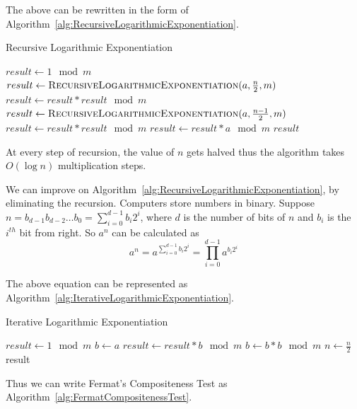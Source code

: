 \documentclass[11pt]{report}
\begin{document}
The above can be rewritten in the form of Algorithm~\ref{alg:RecursiveLogarithmicExponentiation}.

\begin{algorithm}
\caption{Recursive Logarithmic Exponentiation}
\label{alg:RecursiveLogarithmicExponentiation}
\begin{algorithmic}
\State $result \gets 1 \mod m$ 
	\State $result \gets \Call{RecursiveLogarithmicExponentiation}{a, \frac n 2, m}$
	\State $result \gets result * result \mod m$ 
	\State $result \gets \Call{RecursiveLogarithmicExponentiation}{a, \frac {n-1} 2, m}$
	\State $result \gets result * result \mod m$
	\State $result \gets result * a \mod m$
\EndIf
\State \Return $result$
\EndProcedure
\end{algorithmic}
\end{algorithm}

At every step of recursion, the value of $n$ gets halved thus the algorithm takes $O(\log n)$ multiplication steps.

We can improve on Algorithm~\ref{alg:RecursiveLogarithmicExponentiation}, by eliminating the recursion. Computers store numbers in binary. Suppose $n = b_{d-1}b_{d-2}\dots b_{0} = \sum_{i=0}^{d-1}b_i 2^i$, where $d$ is the number of bits of $n$ and $b_i$ is the $i^{th}$ bit from right. So $a^n$ can be calculated as
\[a^n = a^{\sum_{i=0}^{d-1}b_i 2^i} = \prod_{i=0}^{d-1} a^{b_i 2^i}\]

The above equation can be represented as Algorithm~\ref{alg:IterativeLogarithmicExponentiation}.

\begin{algorithm}
\caption{Iterative Logarithmic Exponentiation}
\label{alg:IterativeLogarithmicExponentiation}
\begin{algorithmic}
\State $result \gets 1 \mod m$ 
\State $b \gets a$
 
	\State $result \gets result * b \mod m$ 
\EndIf
\State $b \gets b * b \mod m$ 
\State $n \gets \frac n 2$ 
\EndWhile \label{euclidendwhile}
\State \Return result
\EndProcedure
\end{algorithmic}
\end{algorithm}
Thus we can write Fermat's Compositeness Test as Algorithm~\ref{alg:FermatCompositenessTest}.
\end{document}
